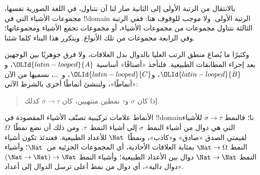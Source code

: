 \documentclass[../../../include/open-logic-section]{subfiles}
\begin{document}


بالانتقال من الرتبة الأولى إلى الثانية صار لنا أن نتناول، في
اللغة الصورية نفسها، مجموعات الأشياء التي في !!{domain}
الرتبة الأولى. ولا موجب للوقوف هنا: ففي الرتبة الثالثة نتناول
مجموعات من مجموعات الأشياء، أو مجموعات تجمع الأشياء ومجموعاتها؛
وفي الرابعة مجموعات من تلك الأنواع. ويتكرر هذا البناء كلما شئنا.

وكثيرًا ما يُصاغ منطق الرتب العليا بالدوال بدل العلاقات، ولا
فرق جوهريًا بين الوجهين بعد إجراء المطابقات الطبيعية. فلنأخذ
«أصنافًا» أساسية $\OLId{latin-looped}{A}$، و$\OLId{latin-looped}{B}$، و$\OLId{latin-looped}{C}$، و~\dots، نسميها من الآن
«أنماطًا»، ولننشئ أنماطًا أخرى بالشرط الآتي:
\begin{quote}
إذا كان $\sigma$ و$\tau$ نمطين منتهيين، كان $\sigma \to \tau$ كذلك.
\end{quote}
الأنماط علامات تركيبية تصنّف الأشياء المقصودة في
!!{domain}نا؛ فالنمط $\sigma \to \tau$ للأشياء التي هي دوال
من أشياء النمط~$\sigma$ إلى أشياء النمط~$\tau$. ومن ذلك أن
نضع نمطًا~$\Omega$ لقيمتي الصدق «صادق» و«كاذب»، ونمطًا~$\Nat$
للأعداد الطبيعية. فعندئذ تكون أشياء النمط $\Nat \to \Omega$
بمثابة العلاقات الأحادية، أي المجموعات الجزئية من~$\Nat$؛
وأشياء النمط $\Nat \to
\Nat$ دوال بين الأعداد الطبيعية؛ وأشياء النمط
$(\Nat \to \Nat) \to \Nat$ «دوال دالية»، أي دوال من نمط أعلى
ترسل الدوال إلى أعداد.
\end{document}
